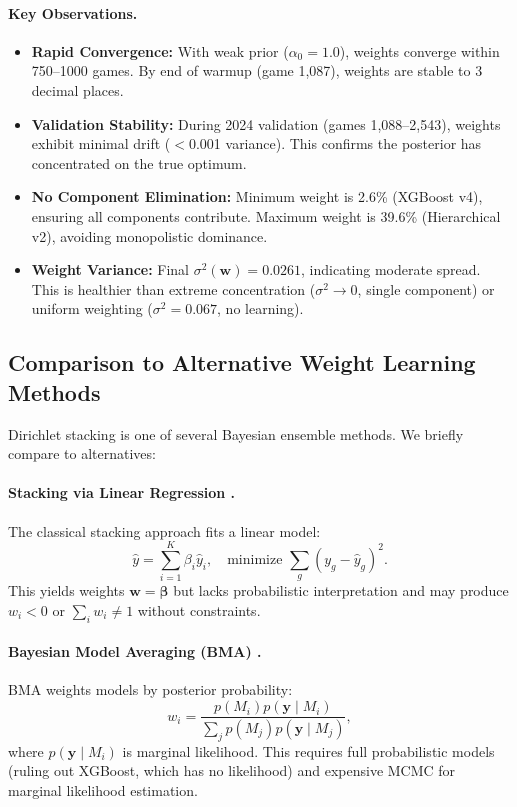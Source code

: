 \paragraph{Key Observations.}
\begin{itemize}
\item \textbf{Rapid Convergence:} With weak prior ($\alpha_0=1.0$), weights converge within 750--1000 games. By end of warmup (game 1,087), weights are stable to 3 decimal places.

\item \textbf{Validation Stability:} During 2024 validation (games 1,088--2,543), weights exhibit minimal drift ($<$0.001 variance). This confirms the posterior has concentrated on the true optimum.

\item \textbf{No Component Elimination:} Minimum weight is 2.6\% (XGBoost v4), ensuring all components contribute. Maximum weight is 39.6\% (Hierarchical v2), avoiding monopolistic dominance.

\item \textbf{Weight Variance:} Final $\sigma^2(\mathbf{w}) = 0.0261$, indicating moderate spread. This is healthier than extreme concentration ($\sigma^2 \to 0$, single component) or uniform weighting ($\sigma^2 = 0.067$, no learning).
\end{itemize}

\subsection{Comparison to Alternative Weight Learning Methods}
\label{subsec:alternative-weight-learning}

Dirichlet stacking is one of several Bayesian ensemble methods. We briefly compare to alternatives:

\paragraph{Stacking via Linear Regression \citep{wolpert1992}.}
The classical stacking approach fits a linear model:
\begin{equation}
\hat{y} = \sum_{i=1}^K \beta_i \hat{y}_i, \quad \text{minimize } \sum_g (y_g - \hat{y}_g)^2.
\end{equation}
This yields weights $\mathbf{w} = \boldsymbol{\beta}$ but lacks probabilistic interpretation and may produce $w_i < 0$ or $\sum_i w_i \neq 1$ without constraints.

\paragraph{Bayesian Model Averaging (BMA) \citep{hoeting1999}.}
BMA weights models by posterior probability:
\begin{equation}
w_i = \frac{p(M_i) p(\mathbf{y} \mid M_i)}{\sum_j p(M_j) p(\mathbf{y} \mid M_j)},
\end{equation}
where $p(\mathbf{y} \mid M_i)$ is marginal likelihood. This requires full probabilistic models (ruling out XGBoost, which has no likelihood) and expensive MCMC for marginal likelihood estimation.


